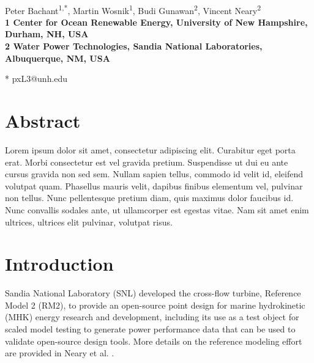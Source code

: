 \documentclass[10pt,letterpaper]{article}
\date{}
\begin{document}
\vspace*{0.35in}

\begin{flushleft}

{\Large \textbf{}}
\newline
\\
Peter Bachant\textsuperscript{1,*},
Martin Wosnik\textsuperscript{1},
Budi Gunawan\textsuperscript{2},
Vincent Neary\textsuperscript{2}
\\
\bigskip
\bf{1} Center for Ocean Renewable Energy, University of New Hampshire, Durham, NH, 
USA
\\
\bf{2} Water Power Technologies, Sandia National Laboratories, Albuquerque, NM, USA
\\
\bigskip

* pxL3@unh.edu

\end{flushleft}

\listoftodos

\section*{Abstract}

Lorem ipsum dolor sit amet, consectetur adipiscing elit. Curabitur eget porta
erat. Morbi consectetur est vel gravida pretium. Suspendisse ut dui eu ante
cursus gravida non sed sem. Nullam sapien tellus, commodo id velit id, eleifend
volutpat quam. Phasellus mauris velit, dapibus finibus elementum vel, pulvinar
non tellus. Nunc pellentesque pretium diam, quis maximus dolor faucibus id. Nunc
convallis sodales ante, ut ullamcorper est egestas vitae. Nam sit amet enim
ultrices, ultrices elit pulvinar, volutpat risus.


\linenumbers

\section*{Introduction} Sandia National Laboratory (SNL) developed the
cross-flow turbine, Reference Model 2 (RM2), to provide an open-source point
design for marine hydrokinetic (MHK) energy research and development, including
its use as a test object for scaled model testing to generate power performance
data that can be used to validate open-source design tools. More details on the
reference modeling effort are provided in Neary et al. \cite{Neary2014}.
\end{document}
